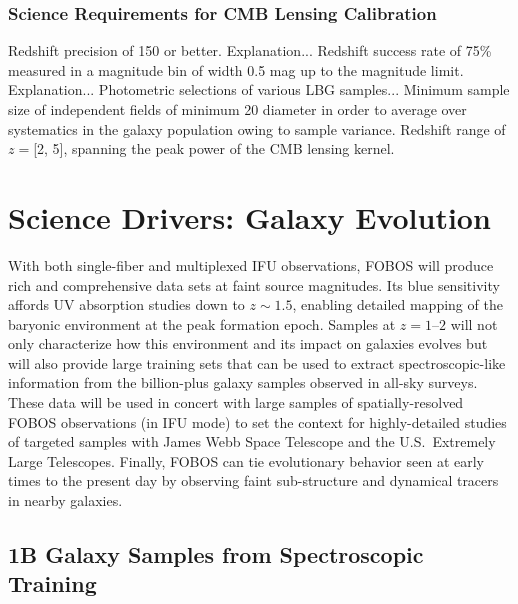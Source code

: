 \documentclass[11pt,a4paper,twoside,onecolumn,openany,final,oldfontcommands]{memoir}
\begin{document}
\subsection{Science Requirements for CMB Lensing Calibration}

\begin{sciencerequirement}
%
\reqitem Redshift precision of 150 \kms{} or better.  Explanation...
%
\reqitem Redshift success rate of 75\% measured in a magnitude bin of width 0.5 mag up to the magnitude limit.  Explanation...
%
\reqitem Photometric selections of various LBG samples...
%
\reqitem Minimum sample size of 
%
 independent fields of minimum 20\arcmin{} diameter in order to average over systematics in the galaxy population owing to sample variance.
%
\reqitem Redshift range of $z = $[2, 5], spanning the peak power of the CMB lensing kernel.
%
\end{sciencerequirement}

\newpage

\chapter{Science Drivers: Galaxy Evolution} \label{sci:galaxies}

With both single-fiber and multiplexed IFU observations, FOBOS will produce rich and comprehensive data sets at faint source magnitudes.  Its blue sensitivity affords UV absorption studies down to $z \sim 1.5$, enabling detailed mapping of the baryonic environment at the peak formation epoch.  Samples at $z=1$--$2$ will not only characterize how this environment and its impact on galaxies evolves but will also provide large training sets that can be used to extract spectroscopic-like information from the billion-plus galaxy samples observed in all-sky surveys.  These data will be used in concert with large samples of spatially-resolved FOBOS observations (in IFU mode) to set the context for highly-detailed studies of targeted samples with James Webb Space Telescope and the U.S.~Extremely Large Telescopes.  Finally, FOBOS can tie evolutionary behavior seen at early times to the present day by observing faint sub-structure and dynamical tracers in nearby galaxies.

\section{1B Galaxy Samples from Spectroscopic Training}
\label{sci:1Bgalaxies}
\end{document}
